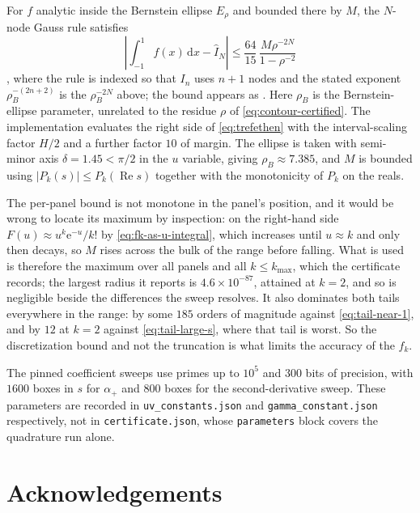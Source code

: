 \documentclass[11pt]{amsart}
\theoremstyle{plain}
\theoremstyle{definition}
\newcommand{\e}{\mathrm e}
\newcommand{\dd}{\,\mathrm d}
\newcommand{\abs}[1]{\lvert #1\rvert}
\begin{document}
For $f$ analytic inside the Bernstein ellipse $E_\rho$ and bounded there by
$M$, the $N$-node Gauss rule satisfies
\begin{equation}\label{eq:trefethen}
 \left|\int_{-1}^1f(x)\dd x-\widehat I_N\right|
 \leq\frac{64}{15}\,\frac{M\rho^{-2N}}{1-\rho^{-2}}
\end{equation}
\cite[Thm.~4.5]{TrefCC}, where the rule is indexed so that $I_n$ uses $n+1$
nodes and the stated exponent $\rho_B^{-(2n+2)}$ is the $\rho_B^{-2N}$ above;
the bound appears as \cite[Thm.~19.3]{ATAP}. Here $\rho_B$ is the
Bernstein-ellipse parameter, unrelated to the residue $\rho$ of
\eqref{eq:contour-certified}. The implementation evaluates the right side of
\eqref{eq:trefethen} with the interval-scaling factor $H/2$ and a further
factor $10$ of margin. The ellipse is taken with semi-minor axis
$\delta=1.45<\pi/2$ in the $u$ variable, giving $\rho_B\approx7.385$, and $M$ is
bounded using $\abs{P_k(s)}\leq P_k(\operatorname{Re}s)$ together with the
monotonicity of $P_k$ on the reals.

The per-panel bound is not monotone in the panel's position, and it would be
wrong to locate its maximum by inspection: on the right-hand side
$F(u)\approx u^k\e^{-u}/k!$ by \eqref{eq:fk-as-u-integral}, which increases
until $u\approx k$ and only then decays, so $M$ rises across the bulk of the
range before falling. What is used is therefore the maximum over all panels and
all $k\leq k_{\max}$, which the certificate records; the largest radius it
reports is $4.6\times10^{-87}$, attained at $k=2$, and so is negligible beside
the differences the sweep resolves. It also dominates both tails everywhere in
the range: by some $185$ orders of magnitude against
\eqref{eq:tail-near-1}, and by $12$ at $k=2$ against
\eqref{eq:tail-large-s}, where that tail is worst. So the
discretization bound and not the truncation is what limits the accuracy of the
$f_k$.

The pinned coefficient sweeps use primes up to $10^5$ and $300$ bits of
precision, with $1600$ boxes in $s$ for $\alpha_+$ and $800$ boxes for the
second-derivative sweep. These parameters are recorded in
\texttt{uv\_constants.json} and \texttt{gamma\_constant.json} respectively, not
in \texttt{certificate.json}, whose \texttt{parameters} block covers the
quadrature run alone.

\section*{Acknowledgements}
\end{document}
